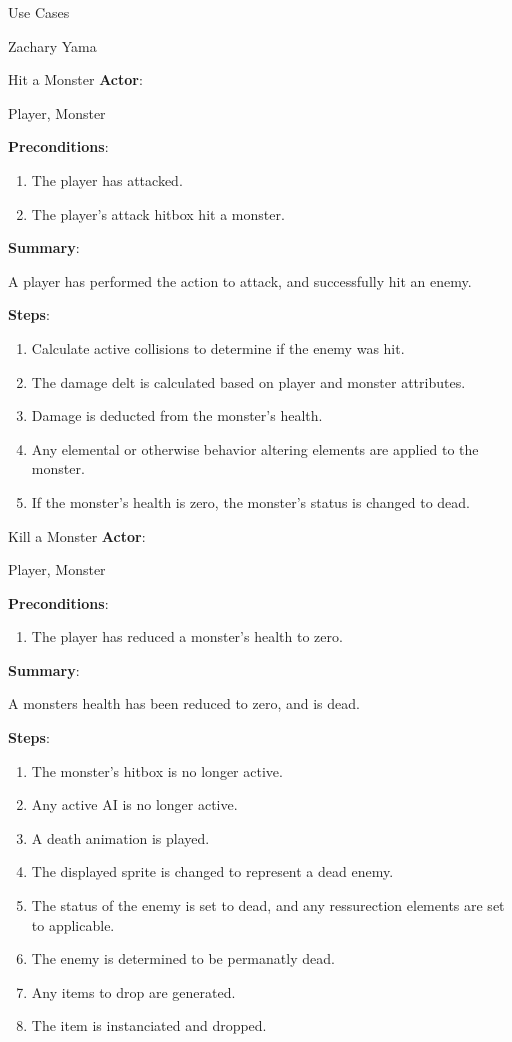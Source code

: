 \documentclass[12pt]{report}
\begin{document}
\begin{section}{Use Cases}
\begin{subsection}{Zachary Yama}
\begin{subsubsection}{Hit a Monster}
\textbf{Actor}:

Player, Monster

\textbf{Preconditions}:

\begin{enumerate}
\item The player has attacked.
\item The player's attack hitbox hit a monster.
\end{enumerate}

\textbf{Summary}:

A player has performed the action to attack, and successfully hit
an enemy.

\textbf{Steps}:

\begin{enumerate}
\item Calculate active collisions to determine if the enemy was hit.
\item The damage delt is calculated based on player and monster attributes.
\item Damage is deducted from the monster's health. 
\item Any elemental or otherwise behavior altering elements are applied to
the monster.
\item  If the monster's health is zero, the monster's status is changed to
dead.
\end{enumerate}
\end{subsubsection}

\begin{subsubsection}{Kill a Monster}
\textbf{Actor}:

Player, Monster

\textbf{Preconditions}:

\begin{enumerate}
\item The player has reduced a monster's health to zero.
\end{enumerate}

\textbf{Summary}:

A monsters health has been reduced to zero, and is dead.

\textbf{Steps}:

\begin{enumerate}
\item The monster's hitbox is no longer active.
\item Any active AI is no longer active.
\item A death animation is played.
\item The displayed sprite is changed to represent a dead enemy.
\item The status of the enemy is set to dead, and any ressurection elements
are set to applicable.
\item The enemy is determined to be permanatly dead.
\item Any items to drop are generated.
\item The item is instanciated and dropped.
\end{enumerate}
\end{subsubsection}


\end{subsection}
\end{section}
\end{document}
